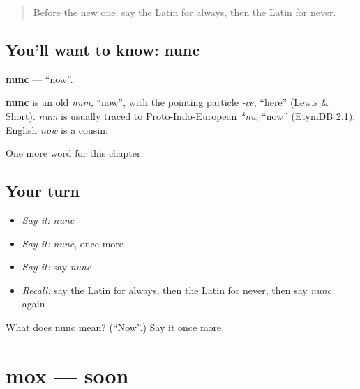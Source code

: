 \label{lesson:LA-C104-nunc}



\begin{quote}
Before the new one: say the Latin for always, then the Latin for never.
\end{quote}

\subsection*{You'll want to know: nunc}
\textbf{nunc} — \textquotedblleft{}now\textquotedblright{}.

\begin{cousinweb}
\textbf{nunc} is an old \emph{num}, \textquotedblleft{}now\textquotedblright{}, with the pointing particle \emph{-ce}, \textquotedblleft{}here\textquotedblright{} (Lewis \& Short). \emph{num} is usually traced to Proto-Indo-European \emph{*nu}, \textquotedblleft{}now\textquotedblright{} (EtymDB 2.1); English \emph{now} is a cousin.
\end{cousinweb}

\begin{grammarlens}[title={What you've built}]
One more word for this chapter.
\end{grammarlens}

\subsection*{Your turn}
\begin{itemize}
\raggedright
  \item \emph{Say it:} \emph{nunc}
  \item \emph{Say it:} \emph{nunc}, once more
  \item \emph{Say it:} say \emph{nunc}
  \item \emph{Recall:} say the Latin for always, then the Latin for never, then say \emph{nunc} again
\end{itemize}

\begin{tcolorbox}[breakable,colback=teal!4,colframe=teal!35!black,title={Before you move on}]
What does nunc mean? (\textquotedblleft{}Now\textquotedblright{}.) Say it once more.
\end{tcolorbox}
\section[mox]{mox — soon}

\label{lesson:LA-C104-mox}



